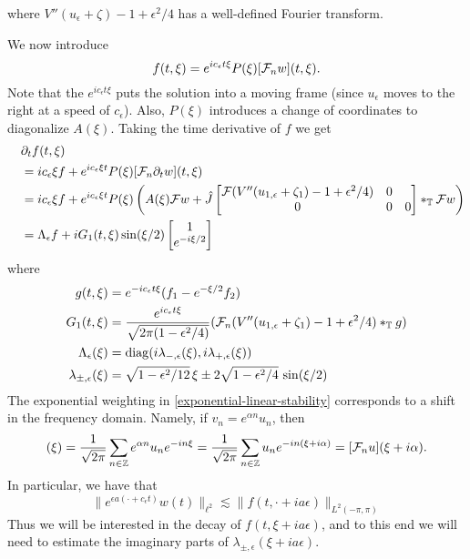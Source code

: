 where \(V''(u_\epsilon + \zeta) - 1 + \epsilon^2/4\) has a well-defined Fourier transform.

We now introduce
\begin{equation}
	f(t,\xi)  = e^{ic_\epsilon t \xi} P(\xi) [\mathcal{F}_n w](t,\xi).
\end{equation}
Note that the \(e^{ic_\epsilon t\xi}\) puts the solution into a moving frame (since \(u_\epsilon\) moves to the right at a speed of \(c_\epsilon\)). Also, \(P(\xi)\) introduces a change of coordinates to diagonalize \(A(\xi)\). Taking the time derivative of \(f\) we get
\begin{equation}\label{f-eqn}
\begin{aligned}
	&\partial_t f(t,\xi) \\
	\quad &= i c_\epsilon \xi f + e^{i c_\epsilon \xi t} P(\xi) [\mathcal{F}_n \partial_t w](t,\xi) \\
	\quad &= i c_\epsilon \xi f + e^{i c_\epsilon \xi t} P(\xi) \left( A(\xi) \mathcal F w + \hat J\begin{bmatrix}
		\mathcal F(V''(u_{1,\epsilon} +\zeta_1) - 1 + \epsilon^2/4) & 0 \\ 0 & 0 & 0 
	\end{bmatrix} *_{\mathbb T} \mathcal F w \right) \\
	\quad &= \Lambda_\epsilon f + i G_1(t,\xi) \sin(\xi/2)\begin{bmatrix}
		1 \\ e^{-i\xi/2}
	\end{bmatrix}
\end{aligned}
\end{equation}
where 
\begin{equation}\label{notation-f-eqn}
\begin{aligned}
	g(t,\xi) &= e^{-ic_\epsilon t \xi}(f_1 - e^{-\xi/2} f_2) \\
	G_1(t,\xi) &= \frac{e^{ic_\epsilon t \xi}}{\sqrt{2\pi (1 - \epsilon^2/ 4) }} (\mathcal{F}_n(V''(u_{1,\epsilon}  + \zeta_1) -1 + \epsilon^2/4) *_{\mathbb T} g ) \\
	\Lambda_\epsilon(\xi) &= \mathrm{diag}(i \lambda_{-,\epsilon} (\xi), i \lambda_{+,\epsilon}(\xi)) \\
	\lambda_{\pm, \epsilon}(\xi) &= \sqrt{1-\epsilon^2/12}\, \xi \pm 2 \sqrt{1-\epsilon^2/4} \, \sin(\xi/2)
\end{aligned}
\end{equation}
The exponential weighting in \cref{exponential-linear-stability} corresponds to a shift in the frequency domain. Namely, if \(v_n = e^{\alpha n} u_n\), then 
\begin{equation}
	[\mcF_n v] (\xi) = \frac 1 {\sqrt{2\pi}} \sum_{n\in\Z} e^{\alpha n} u_n e^{-in\xi} =  \frac 1 {\sqrt{2\pi}} \sum_{n\in\Z}  u_n e^{-in(\xi+i\alpha)} = [\mcF_n u](\xi + i \alpha ).
\end{equation} 
In particular, we have that
\begin{equation}
	\|e^{\epsilon a(\cdot + c_\epsilon t)} w(t) \|_{\ell^2} \lesssim \| f(t, \cdot +ia\epsilon) \|_{L^2(-\pi, \pi)}
\end{equation}
Thus we will be interested in the decay of \(f(t, \xi + ia\epsilon)\), and to this end we will need to estimate the imaginary parts of \(\lambda_{\pm,\epsilon}(\xi + ia\epsilon)\).

